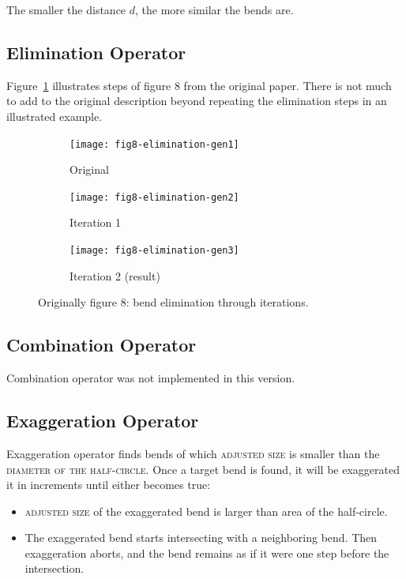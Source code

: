 \documentclass[a4paper]{article}
\begin{document}
The smaller the distance $d$, the more similar the bends are.

\subsection{Elimination Operator}

Figure~\ref{fig:elimination-through-iterations} illustrates steps of figure 8
from the original paper. There is not much to add to the original description
beyond repeating the elimination steps in an illustrated example.

\begin{figure}[ht]
    \centering
    \begin{subfigure}[b]{.7\textwidth}
        \texttt{[image: fig8-elimination-gen1]}
        \caption{Original}
    \end{subfigure}
    \begin{subfigure}[b]{.7\textwidth}
        \texttt{[image: fig8-elimination-gen2]}
        \caption{Iteration 1}
    \end{subfigure}
    \begin{subfigure}[b]{.7\textwidth}
        \texttt{[image: fig8-elimination-gen3]}
        \caption{Iteration 2 (result)}
    \end{subfigure}
    \caption{Originally figure 8: bend elimination through iterations.}
    \label{fig:elimination-through-iterations}
\end{figure}

\subsection{Combination Operator}

Combination operator was not implemented in this version.

\subsection{Exaggeration Operator}
\label{sec:exaggeration-operator}

Exaggeration operator finds bends of which \textsc{adjusted size} is smaller
than the \textsc{diameter of the half-circle}. Once a target bend is found, it
will be exaggerated it in increments until either becomes true:

\begin{itemize}
    \item \textsc{adjusted size} of the exaggerated bend is larger than area of
        the half-circle.

    \item The exaggerated bend starts intersecting with a neighboring bend.
        Then exaggeration aborts, and the bend remains as if it were one step
        before the intersection.

\end{itemize}
\end{document}

